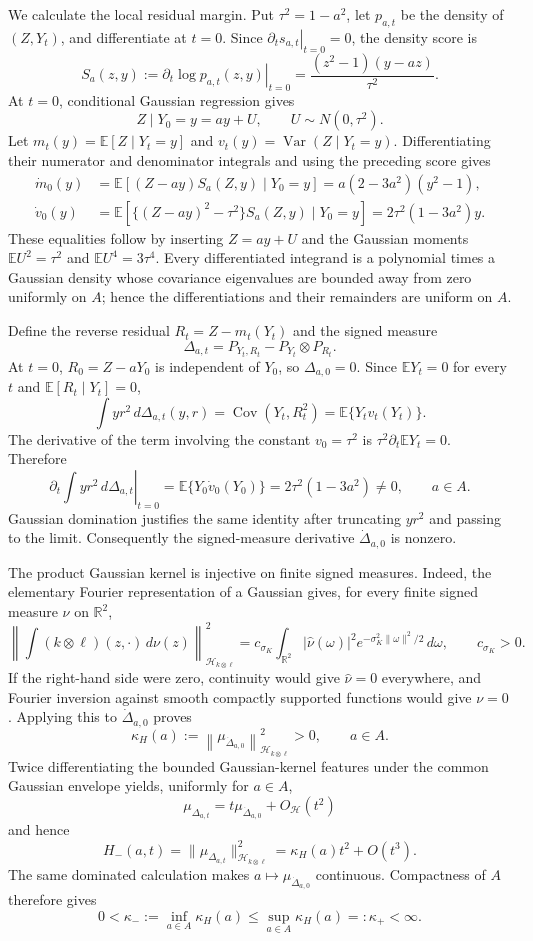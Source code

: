 We calculate the local residual margin.  Put \(\tau^2=1-a^2\), let \(p_{a,t}\) be the density of \((Z,Y_t)\), and differentiate at \(t=0\).  Since \(\left.\partial_t s_{a,t}\right|_{t=0}=0\), the density score is
\[
S_a(z,y):=\left.\partial_t\log p_{a,t}(z,y)\right|_{t=0}
=\frac{(z^2-1)(y-az)}{\tau^2}.
\]
At \(t=0\), conditional Gaussian regression gives
\[
Z\mid Y_0=y=ay+U,\qquad U\sim N(0,\tau^2).
\]
Let \(m_t(y)=\mathbb E[Z\mid Y_t=y]\) and \(v_t(y)=\operatorname{Var}(Z\mid Y_t=y)\).  Differentiating their numerator and denominator integrals and using the preceding score gives
\[
\begin{aligned}
\dot m_0(y)
&=\mathbb E[(Z-ay)S_a(Z,y)\mid Y_0=y]
=a(2-3a^2)(y^2-1),\\
\dot v_0(y)
&=\mathbb E[\{(Z-ay)^2-\tau^2\}S_a(Z,y)\mid Y_0=y]
=2\tau^2(1-3a^2)y.
\end{aligned}
\]
These equalities follow by inserting \(Z=ay+U\) and the Gaussian moments \(\mathbb E U^2=\tau^2\) and \(\mathbb E U^4=3\tau^4\).  Every differentiated integrand is a polynomial times a Gaussian density whose covariance eigenvalues are bounded away from zero uniformly on \(A\); hence the differentiations and their remainders are uniform on \(A\).

Define the reverse residual \(R_t=Z-m_t(Y_t)\) and the signed measure
\[
\Delta_{a,t}=P_{Y_t,R_t}-P_{Y_t}\otimes P_{R_t}.
\]
At \(t=0\), \(R_0=Z-aY_0\) is independent of \(Y_0\), so \(\Delta_{a,0}=0\).  Since \(\mathbb E Y_t=0\) for every \(t\) and \(\mathbb E[R_t\mid Y_t]=0\),
\[
\int yr^2\,d\Delta_{a,t}(y,r)=\operatorname{Cov}(Y_t,R_t^2)=\mathbb E\{Y_tv_t(Y_t)\}.
\]
The derivative of the term involving the constant \(v_0=\tau^2\) is \(\tau^2\partial_t\mathbb E Y_t=0\).  Therefore
\[
\left.\partial_t\int yr^2\,d\Delta_{a,t}\right|_{t=0}
=\mathbb E\{Y_0\dot v_0(Y_0)\}
=2\tau^2(1-3a^2)\ne0,\qquad a\in A.
\]
Gaussian domination justifies the same identity after truncating \(yr^2\) and passing to the limit.  Consequently the signed-measure derivative \(\dot\Delta_{a,0}\) is nonzero.

The product Gaussian kernel is injective on finite signed measures.  Indeed, the elementary Fourier representation of a Gaussian gives, for every finite signed measure \(\nu\) on \(\mathbb R^2\),
\[
\left\|\int (k\otimes\ell)(z,\cdot)\,d\nu(z)\right\|_{\mathcal H_{k\otimes\ell}}^2
=c_{\sigma_K}\int_{\mathbb R^2}|\widehat\nu(\omega)|^2
e^{-\sigma_K^2\|\omega\|^2/2}\,d\omega,\qquad c_{\sigma_K}>0.
\]
If the right-hand side were zero, continuity would give \(\widehat\nu=0\) everywhere, and Fourier inversion against smooth compactly supported functions would give \(\nu=0\).  Applying this to \(\dot\Delta_{a,0}\) proves
\[
\kappa_H(a):=\left\|\mu_{\dot\Delta_{a,0}}\right\|_{\mathcal H_{k\otimes\ell}}^2>0,\qquad a\in A.
\]
Twice differentiating the bounded Gaussian-kernel features under the common Gaussian envelope yields, uniformly for \(a\in A\),
\[
\mu_{\Delta_{a,t}}=t\mu_{\dot\Delta_{a,0}}+O_{\mathcal H}(t^2)
\]
and hence
\[
H_-(a,t)=\|\mu_{\Delta_{a,t}}\|_{\mathcal H_{k\otimes\ell}}^2
=\kappa_H(a)t^2+O(t^3).
\]
The same dominated calculation makes \(a\mapsto\mu_{\dot\Delta_{a,0}}\) continuous.  Compactness of \(A\) therefore gives
\[
0<\kappa_-:=\inf_{a\in A}\kappa_H(a)\le
\sup_{a\in A}\kappa_H(a)=:\kappa_+<\infty.
\]


